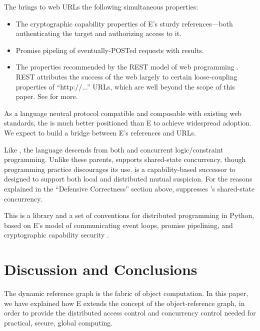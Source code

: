 \documentclass{llncs}
\begin{document}
 The  \cite{tyler:webcalc}
brings to web URLs the following simultaneous properties:
%
\begin{itemize}
\item The cryptographic capability properties of E's sturdy
  references---both authenticating the target and authorizing access
  to it.
\item Promise pipeling of eventually-POSTed requests with results.
\item The properties recommended by the REST model of web programming
  \cite{fielding:rest}. REST attributes the success of the web largely
  to certain loose-coupling properties of ``http://...''  URLs, which
  are well beyond the scope of this paper. See
  \cite{fielding:rest,tyler:webcalc} for more.
\end{itemize}
%
As a language neutral protocol compatible and composable with existing
web standards, the  is much better positioned than E
to achieve widespread adoption. We expect to build a bridge between
E's references and  URLs.

 Like , the  language
\cite{VanRoyHaridi} descends from both  and concurrent
logic/constraint programming. Unlike these parents,  supports
shared-state concurrency, though  programming practice
discourages its use.  \cite{oze} is a capability-based
successor to  designed to support both local and distributed
mutual suspicion. For the reasons explained in the ``Defensive
Correctness'' section above,  suppresses 's
shared-state concurrency.

 This is a library and a set of
conventions for distributed programming in Python, based on E's model
of communicating event loops, promise pipelining, and cryptographic
capability security \cite{twisted}.

\section{Discussion and Conclusions}


The dynamic reference graph is the fabric of object computation. In
this paper, we have explained how E extends the concept of the
object-reference graph, in order to provide the distributed
access control and concurrency control needed for practical, secure,
global computing.
\end{document}
